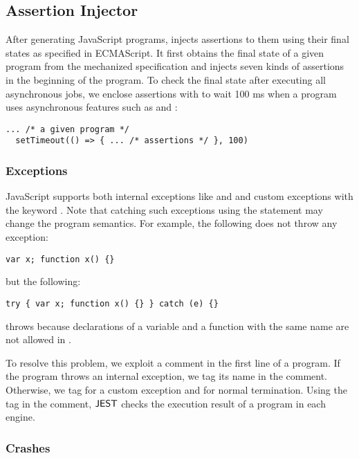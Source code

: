 \subsection{Assertion Injector}

After generating JavaScript programs,  injects
assertions to them using their final states as specified in ECMAScript.
It first obtains the final state of a given program from the
mechanized specification and injects seven kinds of assertions in the beginning of the program.
To check the final state after executing all asynchronous jobs,
we enclose assertions with  to wait 100 ms when a
program uses asynchronous features such as  and :
\begin{lstlisting}[style=myJSstyle]
  ... /* a given program */
  setTimeout(() => { ... /* assertions */ }, 100)
\end{lstlisting}


\subsubsection{Exceptions}

JavaScript supports both internal exceptions like  and
 and custom exceptions with the keyword .
Note that catching such exceptions using the  statement
may change the program semantics.  For example, the following does not throw any exception:
\begin{lstlisting}[style=myJSstyle]
    var x; function x() {}
\end{lstlisting}
but the following:
\begin{lstlisting}[style=myJSstyle]
    try { var x; function x() {} } catch (e) {}
\end{lstlisting}
throws  because declarations of a variable and a function
with the same name are not allowed in .

To resolve this problem, we exploit a comment in the first line of a program.
If the program throws an internal exception, we tag its name in the comment.
Otherwise, we tag  for a custom exception and  for
normal termination.  Using the tag in the comment, $\tool$ checks the
execution result of a program in each engine.


\subsubsection{Crashes}

